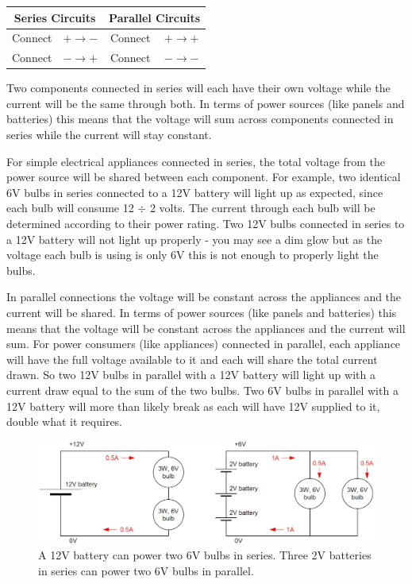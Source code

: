\documentclass{article}
\theoremstyle{definition}
\theoremstyle{definition}
\theoremstyle{remark}
\begin{document}
      \begin{table}[!ht]
        \centering
        \begin{tabular}{|| c | c | c | c ||}
          \hline
          \multicolumn{2}{|c|}{Series Circuits}  & \multicolumn{2}{|c|}{Parallel Circuits}  \\
          \hline \hline
          Connect & $+ \rightarrow -$ & Connect & $+ \rightarrow +$ \\
          \hline
          Connect & $- \rightarrow +$ & Connect & $- \rightarrow -$ \\
          \hline
        \end{tabular}
        \label{table:two_types_of_connections}
      \end{table}

    Two components connected in series will each have their own voltage while the current will be the same through both. In terms of power sources (like panels and batteries) this means that the voltage will sum across components connected in series while the current will stay constant. 

    For simple electrical appliances connected in series, the total voltage from the power source will be shared between each component. For example, two identical 6V bulbs in series connected to a 12V battery will light up as expected, since each bulb will consume 12 \(\div\) 2 volts. The current through each bulb will be determined according to their power rating. Two 12V bulbs connected in series to a 12V battery will not light up properly - you may see a dim glow but as the voltage each bulb is using is only 6V this is not enough to properly light the bulbs.

    In parallel connections the voltage will be constant across the appliances and the current will be shared. In terms of power sources (like panels and batteries) this means that the voltage will be constant across the appliances and the current will sum. For power consumers (like appliances) connected in parallel, each appliance will have the full voltage available to it and each will share the total current drawn. So two 12V bulbs in parallel with a 12V battery will light up with a current draw equal to the sum of the two bulbs. Two 6V bulbs in parallel with a 12V battery will more than likely break as each will have 12V supplied to it, double what it requires. 

    \begin{figure}[!ht]
      \centering
      \includegraphics[width=0.75\paperwidth]{Images/image_2_1_(parallel_v_series_circuit).png}
        \caption*{\centering A 12V battery can power two 6V bulbs in series. Three 2V batteries in series can power two 6V bulbs in parallel.}
    \end{figure}
\end{document}
